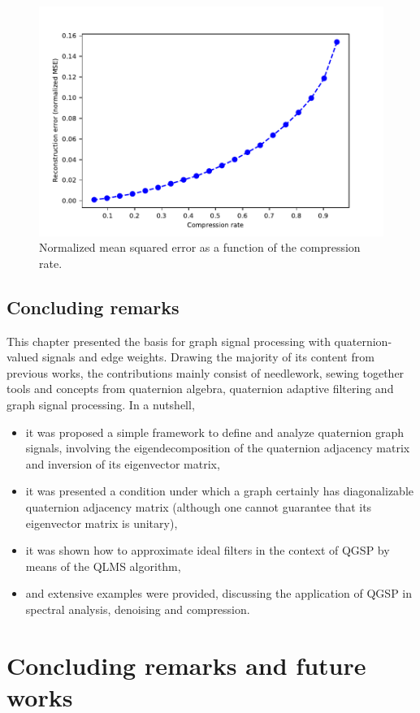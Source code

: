 \begin{figure}
\centering
\includegraphics[width=0.7\linewidth]{thesis/Figures/usa_example/mse_values.pdf}
\caption{Normalized mean squared error as a function of the compression rate.}
\label{fig:mse_values}
\end{figure}

\section{Concluding remarks}

This chapter presented the basis for graph signal processing with quaternion-valued signals and edge weights. Drawing the majority of its content from previous works, the contributions mainly consist of needlework, sewing together tools and concepts from quaternion algebra, quaternion adaptive filtering and graph signal processing. In a nutshell,
\begin{itemize}[noitemsep]
\item it was proposed a simple framework to define and analyze quaternion graph signals, involving the eigendecomposition of the quaternion adjacency matrix and inversion of its eigenvector matrix,
\item it was presented a condition under which a graph certainly has diagonalizable quaternion adjacency matrix (although one cannot guarantee that its eigenvector matrix is unitary),
\item it was shown how to approximate ideal filters in the context of QGSP by means of the QLMS algorithm,
\item and extensive examples were provided, discussing the application of QGSP in spectral analysis, denoising and compression.
\end{itemize}

\chapter{Concluding remarks and future works}
\label{ch:conclusion}

